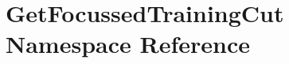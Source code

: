 \hypertarget{namespaceGetFocussedTrainingCut}{
\section{GetFocussedTrainingCut Namespace Reference}
\label{namespaceGetFocussedTrainingCut}
}
